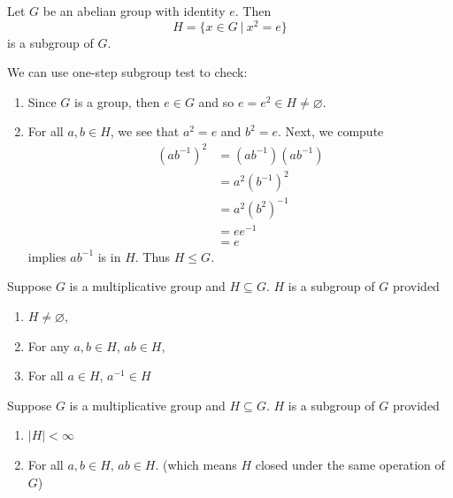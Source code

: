 \begin{example}
    Let $G$ be an abelian group with identity $e$. Then 
    \[
        H = \{ x \in G \> | \> x^2 = e \}
    \]
    is a subgroup of $G$.
\end{example}
\begin{solution}
    We can use one-step subgroup test to check:
    \begin{enumerate}
        \item Since $G$ is a group, then $e \in G$ and so $e = e^2 \in H \neq \varnothing$.
        \item For all $a, b \in H$, we see that $a^2 = e$ and $b^2 = e$. Next, we compute
        \begin{align*}
            (ab^{-1})^2 &= (ab^{-1})(ab^{-1})\\
            &= a^2(b^{-1})^2\\
            &= a^2(b^2)^{-1}\\
            &= ee^{-1}\\
            &= e
        \end{align*}
        implies $ab^{-1}$ is in $H$. Thus $H \leq G$.
    \end{enumerate}
\end{solution}

\begin{theorem}
    Suppose $G$ is a multiplicative group and $H \subseteq G$. 
    $H$ is a subgroup of $G$ provided 
    \begin{enumerate}
        \item $H \neq \varnothing$,
        \item For any $a, b \in H$, $ab \in H$,
        \item For all $a \in H$, $a^{-1} \in H$
    \end{enumerate}
\end{theorem}

\begin{theorem}
    Suppose $G$ is a multiplicative group and $H \subseteq G$. $H$ is a subgroup of $G$ provided 
    \begin{enumerate}
        \item $|H| < \infty$
        \item For all $a,b\in H$, $ab\in H$. (which means $H$ closed under the same operation of $G$)
    \end{enumerate}
\end{theorem}

